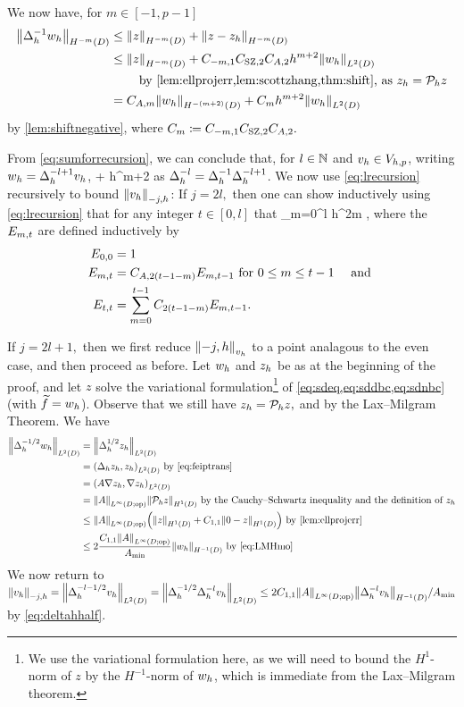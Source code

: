 We now have, for $m \in [-1,p-1]$
\begin{align}
\NHmmD{\DeltahI \wh} &\leq \NHmmD{z} + \NHmmD{z-\zh}\nonumber\\
&\leq \NHmmD{z} + \Cmmo \Cinterpt \CAt h^{m+2} \NLtD{\wh}\nonumber\\
&\quad\quad\text{ by \cref{lem:ellprojerr,lem:scottzhang,thm:shift}, as }\zh = \Ph z\nonumber\\
&= \CAm \NHmmmtD{\wh} + \Cm h^{m+2} \NLtD{\wh}\label{eq:sumforrecursion}
\end{align}
by \cref{lem:shiftnegative}, where $C_{m} \coloneqq C_{-m,1} C_{\mathrm{SZ},2} C_{A,2}.$

From \cref{eq:sumforrecursion}, we can conclude that, for $l \in \mathbb N$ and $v_{h} \in V_{h,p}$, writing $w_{h} = \Delta_{h}^{-l+1} v_{h}$,
\beq\label{eq:lrecursion}
\NHmmD{\Deltahml \vh} \leq \CAm \NHmmmtD{\Deltahmlpo \vh} + \Cm h^{m+2} \NLtD{\Deltahmlpo \vh}
\eeq
as $\Delta_{h}^{-l} = \Delta_{h}^{-1} \Delta_{h}^{-l+1}$. We now use \cref{eq:lrecursion} recursively to bound $\Nmjh{\vh}$:
If $j = 2l,$ then one can show inductively using \cref{eq:lrecursion} that for any integer $t \in [0,l]$ that
\beq\label{eq:evenrecursivesum}
 \leq \sum_{m=0}^l  h^{2m}  ,
\eeq
where the $E_{m,t}$ are defined inductively by
\begin{align}
\label{eq:Emt1}E_{0,0} &=1\\
\label{eq:Emt2}E_{m,t} &= C_{A,2(t-1-m)} E_{m,t-1} \text{ for } 0 \leq m \leq t-1 \quad\text{ and }\\
\label{eq:Emt3}E_{t,t} &= \sum_{m=0}^{t-1} C_{2(t-1-m)} E_{m,t-1}.
\end{align}

If $j=2l+1,$ then we first reduce $\Nfn{\vh}{-j,h}$ to a point analagous to the even case, and then proceed as before. Let $w_{h}$ and $z_{h}$ be as at the beginning of the proof, and let $z$ solve the variational formulation\footnote{We use the variational formulation here, as we will need to bound the $H^1$-norm of $z$ by the $H^{-1}$-norm of $w_{h}$, which is immediate from the Lax--Milgram theorem.}  of \cref{eq:sdeq,eq:sddbc,eq:sdnbc} (with $\widetilde{f} = w_{h}$). Observe that we still have $z_{h} = \mathcal P_{h} z,$ and
\beq\label{eq:LMHmo}
 \leq \frac{\NHmoD{\wh}}{\Amin}
\eeq
by the Lax--Milgram Theorem. We have
\begin{align}
\NLtD{\Deltah^{-1/2}\wh} &= \NLtD{\Deltah^{1/2} \zh}\nonumber\\
&= \IPLtD{\Deltah \zh}{\zh} \text{ by \cref{eq:feiptrans}}\\
&= \IPLtD{A \grad \zh}{\grad \zh}\nonumber\\
&= \NLiDop{A} \NHoD{\Ph z}\nonumber\text{ by the Cauchy--Schwartz inequality and the definition of } \zh\\
&\leq \NLiDop{A}\mleft(\NHoD{z} + \Cfn{1,1}\NHoD{0 - z}\mright) \text{ by \cref{lem:ellprojerr}}\nonumber\\
&\leq 2\frac{\Cfn{1,1}\NLiDop{A}}{\Amin}  \NHmoD{\wh}\text{ by \cref{eq:LMHmo}}\label{eq:deltahhalf}
\end{align}
We now return to $\Nmjh{\vh} = \NLtD{\Deltah^{-l-1/2} \vh} = \NLtD{\Deltah^{-1/2} \Deltah^{-l} \vh} \leq 2\Cfn{1,1}\NLiDop{A}\NHmoD{\Deltah^{-l} \vh}/\Amin$ by \cref{eq:deltahhalf}.


